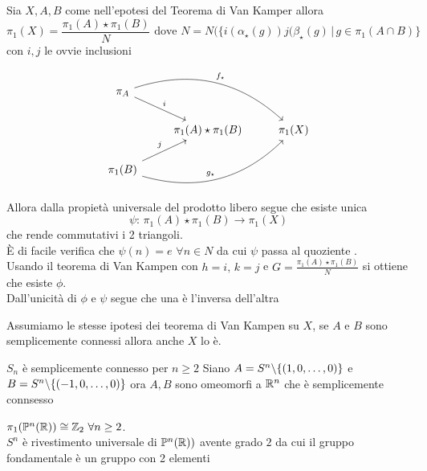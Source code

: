 \begin{cor} Sia $X,A,B$ come nell'epotesi del Teorema di Van Kamper allora 
$$\pi_1(X)= \frac{\pi_1(A)\star \pi_1(B)}{N} \text{ dove } N = N(\{i(\alpha_\star(g))j(\beta_\star(g) \, \vert \, g \in \pi_1(A\cap B)\}$$
con $i,j$ le ovvie inclusioni
\proof

$$ \begin{tikzcd} \pi_A \arrow[bend left] {rrd}{f_\star} \arrow[rd,"i"] \\   &\pi_1(A)\star \pi_1(B) & \pi_1(X) \\ 
\pi_1(B)\arrow[bend right]{rru}{g_\star} \arrow[ru,"j"]  \end{tikzcd}$$ 
Allora dalla propiet\`a universale del prodotto libero segue che esiste unica $$\psi:\, \pi_1(A) \star \pi_1(B) \to \pi_1(X)$$
che rende commutativi i 2 triangoli.\\
\`E di facile verifica che $\psi(n)=e \, \, \forall n \in N$ da cui $\psi$ passa al quoziente .\\
Usando il teorema di Van Kampen con $h=i,\, k=j$ e $G=\frac{\pi_1(A) \star \pi_1(B)}{N}$ si ottiene che esiste $\phi$.\\
Dall'unicit\`a di $\phi$ e $\psi$ segue che una \`e l'inversa dell'altra
\end{cor}
\spazio 
\begin{cor}Assumiamo le stesse ipotesi dei teorema di Van Kampen su $X$, se $A$ e $B$ sono semplicemente connessi allora anche $X$ lo \`e.
\end{cor}
\begin{ese}$S_n$ \`e semplicemente connesso per $n\geq 2$
\proof Siano $A=S^n \backslash \{ (1, 0, \dots, 0)\}$ e $B=S^n \backslash \{ (-1, 0, \dots, 0)\}$ ora $A,B$ sono omeomorfi a $\mathbb{R}^n$ che \`e semplicemente connsesso
\end{ese}
\begin{oss}$\pi_1(\mathbb{P}^n(\mathbb{R})) \cong \mathbb{Z}_2\, \, \forall n \geq 2 $.\\
$S^n$ \`e rivestimento universale di $\mathbb{P}^n(\mathbb{R}))$ avente grado $2$ da cui il gruppo fondamentale \`e un gruppo con 2 elementi 
\end{oss}
